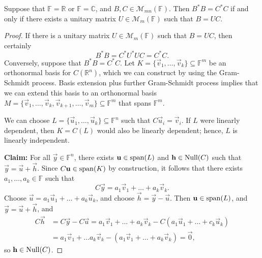 \documentclass{homework}
\begin{document}
	\maketitle
	
	\question Suppose that $\mathbb{F} = \mathbb{R}$ or $\mathbb{F} = \mathbb{C}$, and $B,C \in \mathcal{M}_{mn}(\mathbb{F})$. Then $B^*B = C^*C$ if and only if there exists a unitary matrix $U \in \mathcal{M}_m(\mathbb{F})$ such that $B = UC$.
	
	\begin{proof}
		If there is a unitary matrix $U \in \mathcal{M}_m(\mathbb{F})$ such that $B = UC$, then certainly
		\begin{equation*}
			B^*B = C^*U^*UC =C^*C.
		\end{equation*}
		Conversely, suppose that $B^*B = C^*C$. Let $K = \{\vec{v}_1, \dots, \vec{v}_k\} \subseteq \mathbb{F}^m$ be an orthonormal basis for $C(\mathbb{R}^n)$, which we can construct by using the Gram-Schmidt process. Basis extension plus further Gram-Schmidt process implies that we can extend this basis to an orthonormal basis $M = \{\vec{v}_1, \dots, \vec{v}_k, \vec{v}_{k+1},\dots, \vec{v}_m\}\subseteq \mathbb{F}^m$ that spans $\mathbb{F}^m$.
		
		We can choose $L = \{\vec{u}_1, \dots, \vec{u}_k\} \subseteq \mathbb{F}^n$ such that $C\vec{u}_i = \vec{v}_i$. If $L$ were linearly dependent, then $K = C(L)$ would also be linearly dependent; hence, $L$ is linearly independent.
		
		\textbf{Claim:} For all $\vec{y} \in \mathbb{F}^n$, there exists $\mathbf{u} \in \mathrm{span}(L)$ and $\mathbf{h} \in \mathrm{Null}(C)$ such that $\vec{y} = \vec{u} + \vec{h}$. Since $C\mathbf{u} \in \mathrm{span}(K)$ by construction, it follows that there exists $a_1,\dots, a_k \in \mathbb{F}$ such that
		\begin{equation*}
			C\vec{y} = a_1 \vec{v}_1 + \dots + a_k\vec{v}_k.
		\end{equation*}
		Choose $\vec{u} = a_1\vec{u}_1 + \dots + a_k \vec{u}_k$, and choose $\vec{h} = \vec{y} - \vec{u}$. Then $\mathbf{u} \in \mathrm{span}(L)$, and $\vec{y} = \vec{u} + \vec{h}$, and
		\begin{equation*}
			\begin{aligned}
			C\vec{h} &= C\vec{y} - C\vec{u} = a_1\vec{v}_1 + \dots + a_k\vec{v}_k - C(a_1\vec{u}_1 + \dots + c_k\vec{u}_k) \\
			&= a_1\vec{v}_1 + \dots a_k\vec{v}_k - (a_1\vec{v}_1 + \dots + a_k\vec{v}_k) = \vec{0},
			\end{aligned}
		\end{equation*}
		so $\mathbf{h} \in \mathrm{Null}(C)$.
		

\end{proof}
\end{document}
